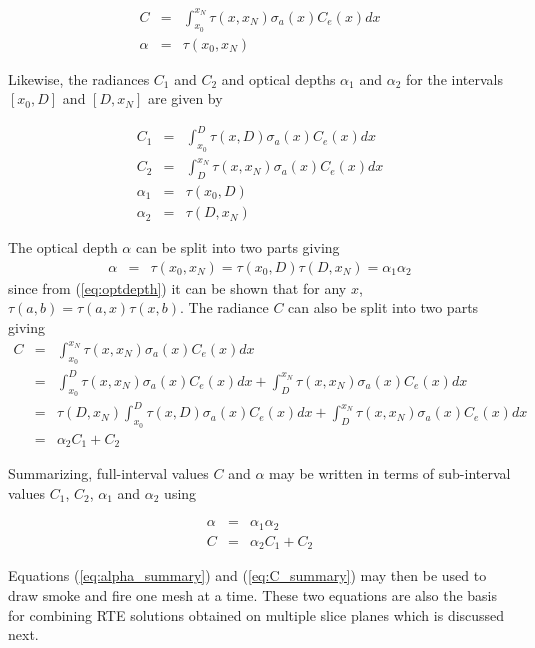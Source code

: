 \begin{eqnarray*}
C&=&\int_{x_0}^{x_N}\tau(x,x_N)\sigma_a(x)C_e(x)dx\\
\alpha&=&\tau(x_0,x_N)
\end{eqnarray*}

Likewise, the radiances $C_1$ and $C_2$ and optical depths $\alpha_1$ and $\alpha_2$ for the intervals $[x_0,D]$ and $[D,x_N]$ are given by

\begin{eqnarray*}
C_1&=&\int_{x_0}^{D}\tau(x,D)\sigma_a(x)C_e(x)dx\\
C_2&=&\int_{D}^{x_N}\tau(x,x_N)\sigma_a(x)C_e(x)dx\\
\alpha_1&=&\tau(x_0,D)\\
\alpha_2&=&\tau(D,x_N)
\end{eqnarray*}

The optical depth $\alpha$ can be split into two parts giving
\begin{eqnarray*}
\alpha&=&\tau(x_0,x_N)=\tau(x_0,D)\tau(D,x_N)=\alpha_1\alpha_2
\end{eqnarray*}
since from (\ref{eq:optdepth}) it can be shown that for any $x$, $\tau(a,b)=\tau(a,x)\tau(x,b)$.
The radiance $C$ can also be split into two parts giving
\begin{eqnarray*}
C&=&\int_{x_0}^{x_N}\tau(x,x_N)\sigma_a(x)C_e(x)dx\\
&=&\int_{x_0}^{D}\tau(x,x_N)\sigma_a(x)C_e(x)dx+\int_{D}^{x_N}\tau(x,x_N)\sigma_a(x)C_e(x)dx\\
&=&\tau(D,x_N)\int_{x_0}^{D}\tau(x,D)\sigma_a(x)C_e(x)dx+\int_{D}^{x_N}\tau(x,x_N)\sigma_a(x)C_e(x)dx\\
&=&\alpha_2C_1+C_2
\end{eqnarray*}

Summarizing, full-interval values $C$ and $\alpha$ may be written in terms of sub-interval values $C_1$, $C_2$, $\alpha_1$ and $\alpha_2$ using

\begin{eqnarray}
\label{eq:alpha_summary}
\alpha&=&\alpha_1\alpha_2\\
\label{eq:C_summary}
C&=&\alpha_2C_1+C_2
\end{eqnarray}

Equations (\ref{eq:alpha_summary}) and (\ref{eq:C_summary}) may then be used to draw smoke and fire one mesh at a time.  These two equations are also the basis for combining RTE solutions obtained on multiple slice planes which is discussed next.


